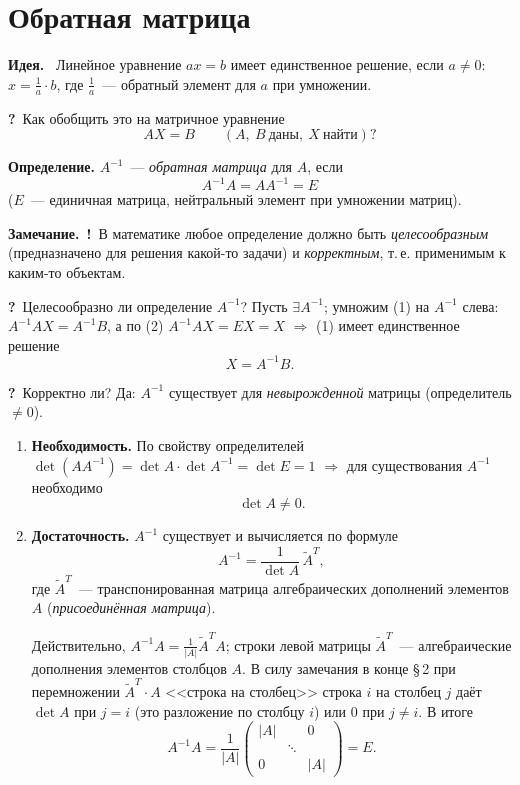 \documentclass[a4paper,11pt]{article}
\newcommand{\lead}[1]{\textbf{\color{leadcol}#1}\ }
\newcommand{\q}{\textbf{\color{red!70!black}?}\ }
\newcommand{\imp}{\textbf{\color{red!70!black}!}\ }
\newcommand{\zam}{\textbf{Замечание.}\ }
\begin{document}
\section{Обратная матрица}
\lead{Идея.} Линейное уравнение $ax=b$ имеет единственное решение, если $a\ne0$: \ $x=\frac1a\cdot b$,
где $\frac1a$~--- обратный элемент для $a$ при умножении.

\q Как обобщить это на матричное уравнение
\[
AX=B\qquad(A,\ B\ \text{даны},\ X\ \text{найти})?\tag{1}
\]

\begin{opr}
\textbf{Определение.} $A^{-1}$~--- \emph{обратная матрица} для $A$, если
\[
A^{-1}A=AA^{-1}=E\tag{2}
\]
($E$~--- единичная матрица, нейтральный элемент при умножении матриц).
\end{opr}

\zam\imp В математике любое определение должно быть \emph{целесообразным} (предназначено для решения
какой-то задачи) и \emph{корректным}, т.\,е. применимым к каким-то объектам.

\q Целесообразно ли определение $A^{-1}$? Пусть $\exists A^{-1}$; умножим (1) на $A^{-1}$ слева:
$A^{-1}AX=A^{-1}B$, а по (2) $A^{-1}AX=EX=X$ $\Rightarrow$ (1) имеет единственное решение
\[
X=A^{-1}B.\tag{3}
\]

\q Корректно ли? Да: $A^{-1}$ существует для \emph{невырожденной} матрицы (определитель $\ne0$).
\begin{enumerate}[label=\arabic*)]
\item \textbf{Необходимость.} По свойству определителей
$\det(AA^{-1})=\det A\cdot\det A^{-1}=\det E=1$ $\Rightarrow$ для существования $A^{-1}$ необходимо
\[
\det A\ne0.\tag{4}
\]
\item \textbf{Достаточность.} $A^{-1}$ существует и вычисляется по формуле
\[
A^{-1}=\frac{1}{\det A}\,\tilde A^{T},\tag{5}
\]
где $\tilde A^T$~--- транспонированная матрица алгебраических дополнений элементов $A$
(\emph{присоединённая матрица}).

Действительно, $A^{-1}A=\frac{1}{|A|}\tilde A^TA$; строки левой матрицы $\tilde A^T$~--- алгебраические
дополнения элементов столбцов $A$. В силу замечания в конце \S\,2 при перемножении
$\tilde A^T\cdot A$ <<строка на столбец>> строка $i$ на столбец $j$ даёт $\det A$ при $j=i$ (это разложение
по столбцу $i$) или $0$ при $j\ne i$. В итоге
\[
A^{-1}A=\frac{1}{|A|}\begin{pmatrix}|A|&&0\\&\ddots&\\0&&|A|\end{pmatrix}=E.
\]
\end{enumerate}
\end{document}
